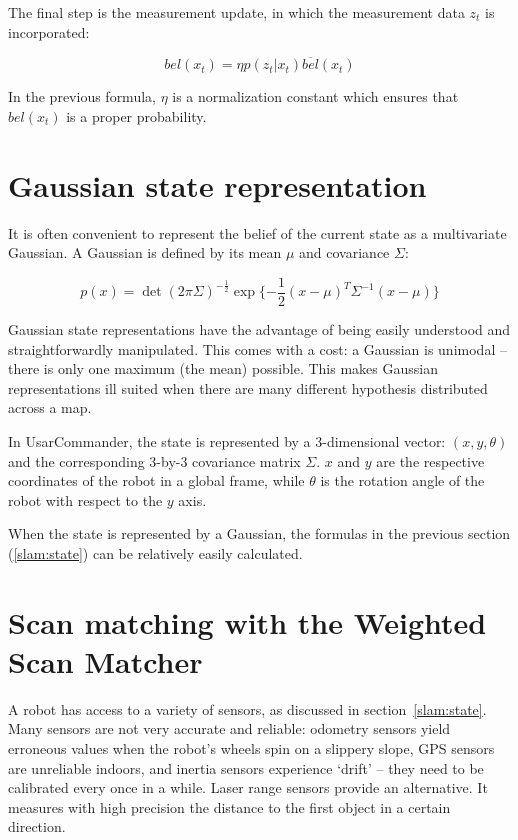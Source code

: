 The final step is the measurement update, in which the measurement data $z_t$ is incorporated:

\begin{equation}
bel(x_t) = \eta p(z_t|x_t)\overline{bel}(x_t)
\end{equation}

In the previous formula, $\eta$ is a normalization constant which ensures that $bel(x_t)$ is a proper probability.

\section{Gaussian state representation}
It is often convenient to represent the belief of the current state as a multivariate Gaussian. A Gaussian is defined by its mean $\mu$ and covariance $\Sigma$:

\begin{equation}
p(x) = \det(2\pi\Sigma)^{-\frac{1}{2}}\exp{\{-\frac{1}{2}(x - \mu)^T\Sigma^{-1}(x - \mu)\}}
\end{equation}

Gaussian state representations have the advantage of being easily understood and straightforwardly manipulated. This comes with a cost: a Gaussian is unimodal -- there is only one maximum (the mean) possible. This makes Gaussian representations ill suited when there are many different hypothesis distributed across a map. 

In UsarCommander, the state is represented by a 3-dimensional vector: $(x, y, \theta)$ and the corresponding 3-by-3 covariance matrix $\Sigma$. $x$ and $y$ are the respective coordinates of the robot in a global frame, while $\theta$ is the rotation angle of the robot with respect to the $y$ axis.

When the state is represented by a Gaussian, the formulas in the previous section (\ref{slam:state}) can be relatively easily calculated.

\section{Scan matching with the Weighted Scan Matcher}
\label{scanmatching}
A robot has access to a variety of sensors, as discussed in section~\ref{slam:state}. Many sensors are not very accurate and reliable: odometry sensors yield erroneous values when the robot's wheels spin on a slippery slope, GPS sensors are unreliable indoors, and inertia sensors experience `drift' -- they need to be calibrated every once in a while. Laser range sensors provide an alternative. It measures with high precision the distance to the first object in a certain direction. 

